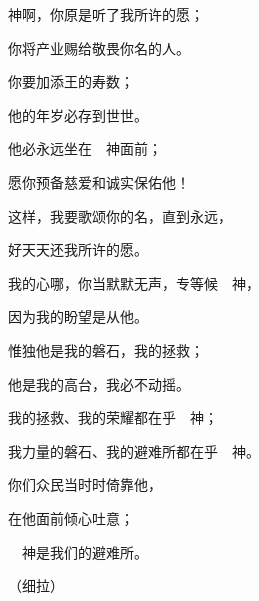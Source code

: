 {\Q {}神啊，你原是听了我所许的愿；
\par }{\Q 你将产业赐给敬畏你名的人。
\par }{\BB \par }{\Q {}你要加添王的寿数；
\par }{\Q 他的年岁必存到世世。
\par }{\Q {}他必永远坐在　神面前；
\par }{\Q 愿你预备慈爱和诚实保佑他！
\par }{\BB \par }{\Q {}这样，我要歌颂你的名，直到永远，
\par }{\Q 好天天还我所许的愿。

\par }
{\BB \par }{\Q {}我的心哪，你当默默无声，专等候　神，
\par }{\Q 因为我的盼望是从他{}。
\par }{\Q {}惟独他是我的磐石，我的拯救；
\par }{\Q 他是我的高台，我必不动摇。
\par }{\Q {}我的拯救、我的荣耀都在乎　神；
\par }{\Q 我力量的磐石、我的避难所都在乎　神。
\par }{\BB \par }{\Q {}你们众民当时时倚靠他，
\par }{\Q 在他面前倾心吐意；
\par }{\Q 　神是我们的避难所。
\par }{\QS （细拉）
\par }
